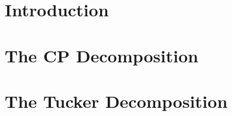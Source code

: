 \documentclass[MS]{wfuthesis}
\begin{document}
    \chapter{\textbf{Introduction}}
        
        \newpage





    \chapter{\textbf{The CP Decomposition}}
        
        \newpage





    \chapter{\textbf{The Tucker Decomposition}}
        
        \newpage





    \printbibliography
    




\end{document}
